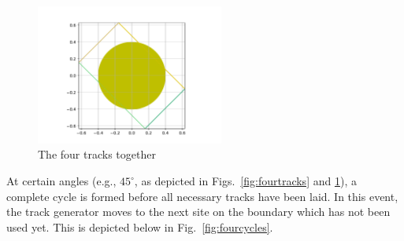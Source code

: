 \documentclass[12pt]{article}
\begin{document}
\begin{figure}[h]
\centering
\includegraphics[width=0.55\textwidth]{figs/Cyc0.pdf}
\caption{The four tracks together}
\label{fig:cycletracks}
\end{figure}

\newpage

At certain angles (e.g., $45^\circ$, as depicted in Figs.~\ref{fig:fourtracks} and \ref{fig:cycletracks}), a complete cycle is formed before all necessary tracks have been laid. In this event, the track generator moves to the next site on the boundary which has not been used yet. This is depicted below in Fig.~\ref{fig:fourcycles}.
\end{document}
